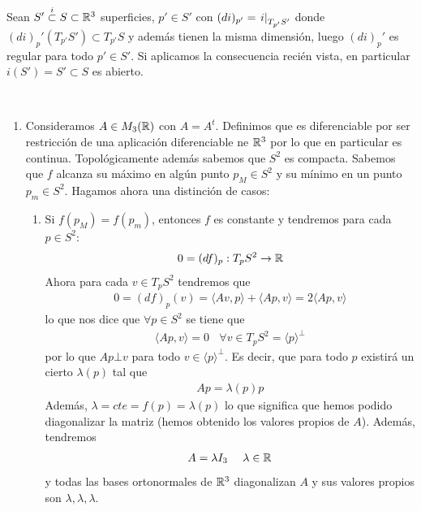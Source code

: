 \begin{propiedades}
\begin{enumerate}
\begin{enumerate}
            \begin{ejemplo}
                Sean $S'\overset{i}{\subset}S \subset \mathbb{R}^3$ superficies, $p'\in S'$ con $(di)_{p'} = { \left.{i}\right|_{T_{p'}S'} }$ donde $(di)_p'(T_{p'}S')\subset T_{p'}S$ y además tienen la misma dimensión, luego $(di)_p'$ es regular para todo $p'\in S'$. Si aplicamos la consecuencia recién vista, en particular $i(S')=S'\subset S$ es abierto. 
            \end{ejemplo}
        \end{enumerate}
    \end{enumerate}
\end{propiedades}

\begin{ejercicio}\
    \begin{enumerate}
        \item Consideramos $A\in M_3(\mathbb{R})$ con $A=A^t$. Definimos 
        \Func{f}{S^2}{\bb{R}}{p}{f(p)=\langle Ap, p \rangle}
        que es diferenciable por ser restricción de una aplicación diferenciable ne $\mathbb{R}^3$ por lo que en particular es continua. Topológicamente además sabemos que $S^2$ es compacta. Sabemos que $f$ alcanza su máximo en algún punto $p_M\in S^2$ y su mínimo en un punto $p_m\in S^2$. Hagamos ahora una distinción de casos:
        \begin{enumerate}
            \item Si $f(p_M)=f(p_m)$, entonces $f$ es constante y tendremos para cada $p\in S^2$:
            \begin{gather*}
                0=(df)_p : T_pS^2 \to \mathbb{R}
            \end{gather*}
            Ahora para cada $v\in T_pS^2$ tendremos que 
            \begin{gather*}
                0 = (df)_p(v) = \langle Av, p \rangle + \langle Ap, v \rangle = 2 \langle Ap, v \rangle
            \end{gather*}
            lo que nos dice que $\forall p \in S^2$ se tiene que
            \begin{gather*}
                \langle Ap, v \rangle = 0 \ \ \ \ \forall v \in T_pS^2 = \langle p \rangle^{\bot}
            \end{gather*}
            por lo que $Ap \bot v$ para todo $v\in \langle p \rangle^\bot$. Es decir, que para todo $p$ existirá un cierto $\lambda(p)$ tal que 
            \begin{gather*}
                Ap=\lambda(p)p
            \end{gather*}
            Además, $\lambda = cte = f(p) = \lambda(p)$ lo que significa que hemos podido diagonalizar la matriz (hemos obtenido los valores propios de $A$). Además, tendremos
            \begin{gather*}
                A = \lambda I_3 \ \ \ \ \lambda \in \mathbb{R}
            \end{gather*}
            y todas las bases ortonormales de $\mathbb{R}^3$ diagonalizan $A$ y sus valores propios son $\lambda, \lambda, \lambda$.


\end{enumerate}
\end{enumerate}
\end{ejercicio}
